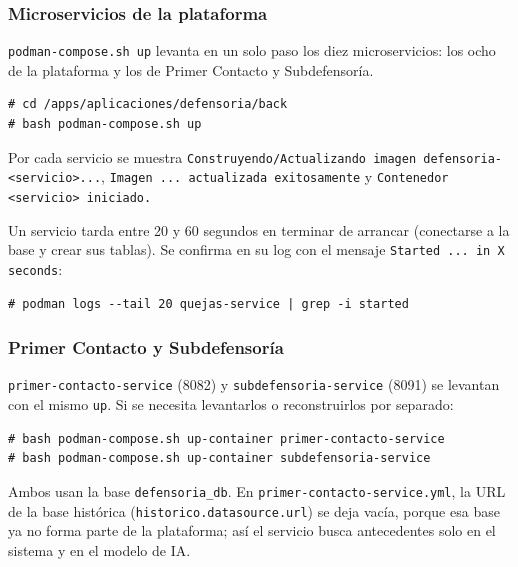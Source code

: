 \subsubsection{Microservicios de la plataforma}
\texttt{podman-compose.sh up} levanta en un solo paso los diez microservicios: los ocho de la plataforma y los de Primer Contacto y Subdefensoría.
\begin{lstlisting}
# cd /apps/aplicaciones/defensoria/back
# bash podman-compose.sh up
\end{lstlisting}
Por cada servicio se muestra \texttt{Construyendo/Actualizando imagen defensoria-<servicio>...}, \texttt{Imagen ... actualizada exitosamente} y \texttt{Contenedor <servicio> iniciado.}

Un servicio tarda entre 20 y 60 segundos en terminar de arrancar (conectarse a la base y crear sus tablas). Se confirma en su log con el mensaje \texttt{Started ... in X seconds}:
\begin{lstlisting}
# podman logs --tail 20 quejas-service | grep -i started
\end{lstlisting}

\subsubsection{Primer Contacto y Subdefensoría}
\texttt{primer-contacto-service} (8082) y \texttt{subdefensoria-service} (8091) se levantan con el mismo \texttt{up}. Si se necesita levantarlos o reconstruirlos por separado:
\begin{lstlisting}
# bash podman-compose.sh up-container primer-contacto-service
# bash podman-compose.sh up-container subdefensoria-service
\end{lstlisting}
Ambos usan la base \texttt{defensoria\_db}. En \texttt{primer-contacto-service.yml}, la URL de la base histórica (\texttt{historico.datasource.url}) se deja vacía, porque esa base ya no forma parte de la plataforma; así el servicio busca antecedentes solo en el sistema y en el modelo de IA.

